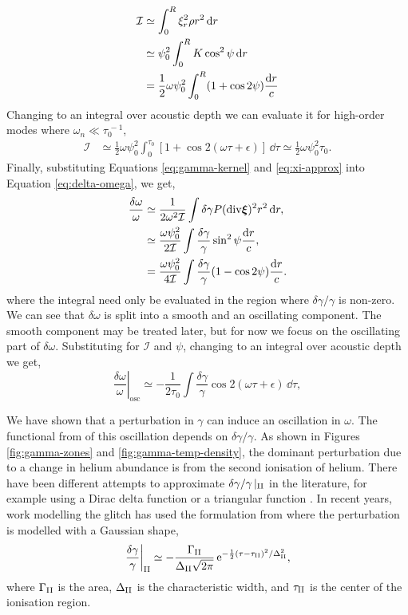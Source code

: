 \begin{align}
    \mathcal{I} &\simeq \int_0^R \xi_r^2 \rho r^2 \, \mathrm{d} r \notag\\
    &\simeq \psi_0^2 \int_0^R K \cos^2\psi \, \mathrm{d} r \notag \\
    &= \frac12 \omega \psi_0^2 \int_0^R (1 + \cos 2 \psi) \frac{\mathrm{d} r}{c}
\end{align}
%
Changing to an integral over acoustic depth we can evaluate it for high-order modes where \(\omega_n \ll \tau_0^{\,-1}\),
%
\begin{align}
    \mathcal{I} &\simeq \frac12 \omega \psi_0^2 \int_0^{\tau_0} [1 + \cos 2 (\omega\tau + \epsilon)] \, \dd \tau \simeq \frac12 \omega \psi_0^2 \tau_0.
\end{align}
%
Finally, substituting Equations \ref{eq:gamma-kernel} and \ref{eq:xi-approx} into Equation \ref{eq:delta-omega}, we get,
%
\begin{align}
    \frac{\delta\omega}{\omega} &\simeq \frac{1}{2\omega^2\mathcal{I}} \int \delta\gamma P (\mathrm{div} \bm{\xi})^2 r^2 \, \mathrm{d} r, \notag \\
    &\simeq \frac{\omega \psi_0^2}{2 \mathcal{I}} \int \frac{\delta\gamma}{\gamma}\sin^2\psi\frac{\mathrm{d} r}{c}, \notag \\
    &= \frac{\omega \psi_0^2}{4 \mathcal{I}} \int \frac{\delta\gamma}{\gamma}(1 - \cos 2\psi)\frac{\mathrm{d} r}{c}.
\end{align}
%
where the integral need only be evaluated in the region where \(\delta\gamma / \gamma\) is non-zero. We can see that \(\delta\omega\) is split into a smooth and an oscillating component. The smooth component may be treated later, but for now we focus on the oscillating part of \(\delta\omega\). Substituting for \(\mathcal{I}\) and \(\psi\), changing to an integral over acoustic depth we get,
%
\begin{equation}
    \left.\frac{\delta\omega}{\omega}\right|_\mathrm{osc} \simeq - \frac{1}{2\tau_0} \int \frac{\delta\gamma}{\gamma} \cos 2 (\omega\tau + \epsilon) \, \dd \tau,
\end{equation}
%

We have shown that a perturbation in \(\gamma\) can induce an oscillation in \(\omega\). The functional from of this oscillation depends on \(\delta\gamma/\gamma\). As shown in Figures \ref{fig:gamma-zones} and \ref{fig:gamma-temp-density}, the dominant perturbation due to a change in helium abundance is from the second ionisation of helium. There have been different attempts to approximate \(\delta\gamma/\gamma\,|_{{\mathrm{II}}}\) in the literature, for example using a Dirac delta function or a triangular function \citep{Monteiro.Christensen-Dalsgaard.ea1994, Monteiro.Thompson2005}. In recent years, work modelling the glitch has used the formulation from \citet{Houdek.Gough2007} where the perturbation is modelled with a Gaussian shape,
%
\begin{equation}
    \left.\frac{\delta\gamma}{\gamma}\right|_{{\mathrm{II}}} \simeq - \frac{\Gamma_{{\mathrm{II}}}}{\Delta_{{\mathrm{II}}} \sqrt{2\pi}} \, \mathrm{e}^{- \frac12{(\tau - \tau_{{\mathrm{II}}})^2}/{\Delta_{{\mathrm{II}}}^2} },
\end{equation}
%
where \(\Gamma_{{\mathrm{II}}}\) is the area, \(\Delta_{{\mathrm{II}}}\) is the characteristic width, and \(\tau_{{\mathrm{II}}}\) is the center of the ionisation region.

